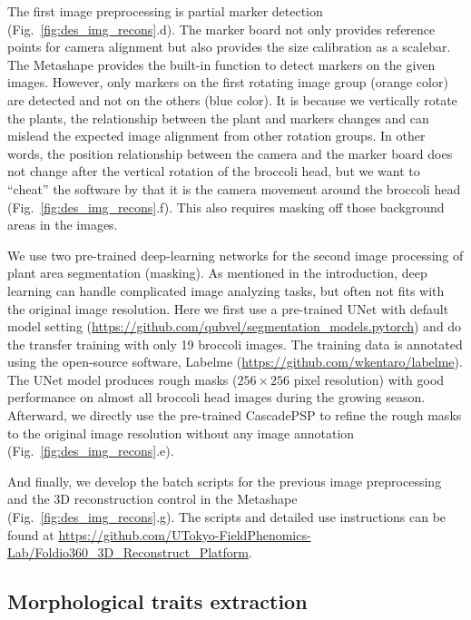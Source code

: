 The first image preprocessing is partial marker detection (Fig.~\ref{fig:des_img_recons}.d). The marker board not only provides reference points for camera alignment but also provides the size calibration as a scalebar. The Metashape provides the built-in function to detect markers on the given images. However, only markers on the first rotating image group (orange color) are detected and not on the others (blue color). It is because we vertically rotate the plants, the relationship between the plant and markers changes and can mislead the expected image alignment from other rotation groups. In other words, the position relationship between the camera and the marker board does not change after the vertical rotation of the broccoli head, but we want to ``cheat'' the software by that it is the camera movement around the broccoli head (Fig.~\ref{fig:des_img_recons}.f). This also requires masking off those background areas in the images.

We use two pre-trained deep-learning networks for the second image processing of plant area segmentation (masking). As mentioned in the introduction, deep learning can handle complicated image analyzing tasks, but often not fits with the original image resolution. Here we first use a pre-trained UNet with default model setting (\url{https://github.com/qubvel/segmentation_models.pytorch}) and do the transfer training with only 19 broccoli images. The training data is annotated using the open-source software, Labelme (\url{https://github.com/wkentaro/labelme}). The UNet model produces rough masks ($256 \times 256$ pixel resolution) with good performance on almost all broccoli head images during the growing season. Afterward, we directly use the pre-trained CascadePSP \citep[\url{https://github.com/hkchengrex/CascadePSP}]{cheng_cascadepsp_2020} to refine the rough masks to the original image resolution without any image annotation (Fig.~\ref{fig:des_img_recons}.e).

And finally, we develop the batch scripts for the previous image preprocessing and the 3D reconstruction control in the Metashape (Fig.~\ref{fig:des_img_recons}.g). The scripts and detailed use instructions can be found at \url{https://github.com/UTokyo-FieldPhenomics-Lab/Foldio360_3D_Reconstruct_Platform}.

\subsection{Morphological traits extraction}

